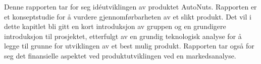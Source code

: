 Denne rapporten tar for seg idéutviklingen av produktet AutoNuts. Rapporten er 
et konseptstudie for å vurdere gjennomførbarheten av et slikt produkt. Det vil 
i dette kapitlet bli gitt en kort introduksjon av gruppen og en grundigere introduksjon til prosjektet, etterfulgt 
av en grundig teknologisk analyse for å legge til grunne for utviklingen 
av et best mulig produkt. Rapporten tar også for seg det finansielle aspektet ved 
produktutviklingen ved en markedsanalyse.
